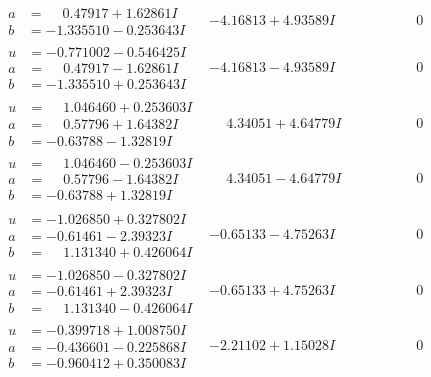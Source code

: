 \documentclass[1p]{elsarticle_modified}
\theoremstyle{definition}
\begin{document}
$$\begin{array}{c|c|c}
\begin{aligned}
a &= \phantom{-}0.47917 + 1.62861 I \\
b &= -1.335510 - 0.253643 I\end{aligned}
 & -4.16813 + 4.93589 I & \phantom{-0.000000 } 0 \\ \hline\begin{aligned}
u &= -0.771002 - 0.546425 I \\
a &= \phantom{-}0.47917 - 1.62861 I \\
b &= -1.335510 + 0.253643 I\end{aligned}
 & -4.16813 - 4.93589 I & \phantom{-0.000000 } 0 \\ \hline\begin{aligned}
u &= \phantom{-}1.046460 + 0.253603 I \\
a &= \phantom{-}0.57796 + 1.64382 I \\
b &= -0.63788 - 1.32819 I\end{aligned}
 & \phantom{-}4.34051 + 4.64779 I & \phantom{-0.000000 } 0 \\ \hline\begin{aligned}
u &= \phantom{-}1.046460 - 0.253603 I \\
a &= \phantom{-}0.57796 - 1.64382 I \\
b &= -0.63788 + 1.32819 I\end{aligned}
 & \phantom{-}4.34051 - 4.64779 I & \phantom{-0.000000 } 0 \\ \hline\begin{aligned}
u &= -1.026850 + 0.327802 I \\
a &= -0.61461 - 2.39323 I \\
b &= \phantom{-}1.131340 + 0.426064 I\end{aligned}
 & -0.65133 - 4.75263 I & \phantom{-0.000000 } 0 \\ \hline\begin{aligned}
u &= -1.026850 - 0.327802 I \\
a &= -0.61461 + 2.39323 I \\
b &= \phantom{-}1.131340 - 0.426064 I\end{aligned}
 & -0.65133 + 4.75263 I & \phantom{-0.000000 } 0 \\ \hline\begin{aligned}
u &= -0.399718 + 1.008750 I \\
a &= -0.436601 - 0.225868 I \\
b &= -0.960412 + 0.350083 I\end{aligned}
 & -2.21102 + 1.15028 I & \phantom{-0.000000 } 0 \\ \hline\begin{aligned}

\end{aligned}
\end{array}$$
\end{document}
